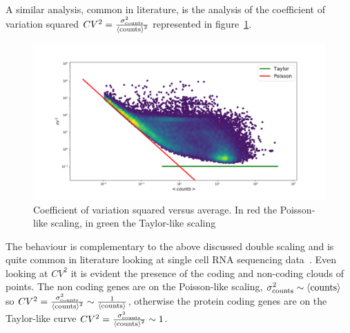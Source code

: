 A similar analysis, common in literature, is the analysis of the coefficient of variation squared $CV^2=\frac{\sigma^2_{\mathrm{counts}}}{\left\langle \mathrm{counts}\right\rangle^2}$ represented in figure~\ref{fig:scalelaws/gtex/allgenes/cvmean_loglog}.
\begin{figure}[htb!]
    \centering
    \includegraphics[width=0.9\linewidth]{pictures/scalelaws/gtex/allgenes/cvmean_loglog.png}
    \caption{Coefficient of variation squared versus average. In red the Poisson-like scaling, in green the Taylor-like scaling}
    \label{fig:scalelaws/gtex/allgenes/cvmean_loglog}
\end{figure}
The behaviour is complementary to the above discussed double scaling and is quite common in literature looking at single cell RNA sequencing data~\cite{Islam2013}. Even looking at $CV^2$ it is evident the presence of the coding and non-coding clouds of points. The non coding genes are on the Poisson-like scaling, $\sigma^2_{\mathrm{counts}} \sim \left\langle \mathrm{counts}\right\rangle$ so $CV^2=\frac{\sigma^2_{\mathrm{counts}}}{\left\langle \mathrm{counts}\right\rangle^2}\sim\frac{1}{\left\langle \mathrm{counts}\right\rangle}$, otherwise the protein coding genes are on the Taylor-like curve $CV^2=\frac{\sigma^2_{\mathrm{counts}}}{\left\langle \mathrm{counts}\right\rangle^2}\sim 1$.

